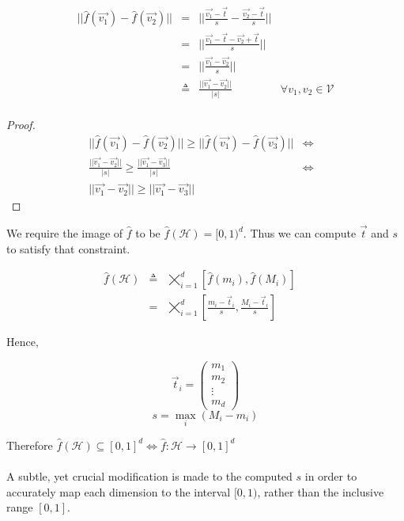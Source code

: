 \documentclass{juliacon}
\begin{document}
\begin{lemma}
  $$
  \begin{matrix}
    ||\hat{f}(\vec{v_1}) - \hat{f}(\vec{v_2})|| &=& || \frac{\vec{v_1} - \vec{t}}{s} - \frac{\vec{v_2} - \vec{t}}{s}||\\
                                                &=& || \frac{\vec{v_1} - \vec{t} - \vec{v_2} + \vec{t}}{s}||\\
                                                &=& || \frac{\vec{v_1} - \vec{v_2}}{s}||\\
                                                &\triangleq& \frac{||\vec{v_1} - \vec{v_2}||}{|s|} & \forall v_1, v_2 \in \mathcal{V}\\
  \end{matrix}
  $$
\end{lemma}
\begin{proof}
  $$
  \begin{matrix}
    ||\hat{f}(\vec{v_1}) - \hat{f}(\vec{v_2})|| \geq ||\hat{f}(\vec{v_1}) - \hat{f}(\vec{v_3})|| &\Leftrightarrow&\\
    \frac{||\vec{v_1} - \vec{v_2}||}{|s|} \geq \frac{||\vec{v_1} - \vec{v_3}||}{|s|} &\Leftrightarrow&\\
    ||\vec{v_1} - \vec{v_2}|| \geq ||\vec{v_1} - \vec{v_3}||
  \end{matrix}
  $$
$$$$
\end{proof}

We require the image of $\hat{f}$ to be $\hat{f}(\mathcal{H}) = [0,1)^d$. Thus we can
compute $\vec{t}$ and $s$ to satisfy that constraint.

$$
\begin{matrix}
  \hat{f}(\mathcal{H}) & \triangleq & \bigtimes\limits_{i=1}^d [\hat{f}(m_i), \hat{f}(M_i)] &\\
                       & = & \bigtimes\limits_{i=1}^d [\frac{m_i-\vec{t}_i}{s}, \frac{M_i-\vec{t}_i}{s}] &\
\end{matrix}
$$

Hence,

$$ \vec{t}_i = \begin{pmatrix} m_1 \\ m_2 \\ \vdots \\ m_d \end{pmatrix}$$
$$ s = \max_i(M_i-m_i)$$

Therefore $\hat{f}(\mathcal{H}) \subseteq [0, 1]^d \Leftrightarrow \hat{f}: \mathcal{H} \rightarrow [0,1]^d$
\\\\
A subtle, yet crucial modification is made to the computed $s$ in order to
accurately map each dimension to the interval $[0,1)$, rather than the inclusive range
$[0,1]$.
\end{document}
